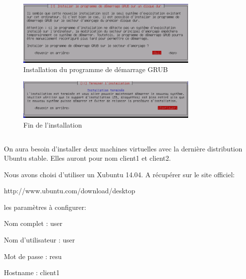 \documentclass[11pt,a4paper,titlepage, oneside]{article}
\begin{document}
		\begin{figure}[htp]
                        \centering
                        \includegraphics[width=0.8\textwidth,natwidth=610,natheight=642]{images/debian21.png}
                        \caption{Installation du programme de démarrage GRUB}
 		\end{figure}

		\begin{figure}[htp]
                        \centering
                        \includegraphics[width=0.8\textwidth,natwidth=610,natheight=642]{images/debian22.png}
                        \caption{Fin de l'installation}
		\end{figure}
		
\newpage
\subsection{{\color{blue}{Installation du client ubuntu}}}
	\paragraph{}
	        On aura besoin d'installer deux machines virtuelles avec la dernière distribution Ubuntu stable. Elles auront pour nom client1 et client2.

		Nous avons choisi d'utiliser un Xubuntu 14.04. A récupérer sur le site officiel:
		
		http://www.ubuntu.com/download/desktop
		
		les paramètres à configurer:
		
		Nom complet : user
			
		Nom d'utilisateur : user
		
		Mot de passe : resu
		
		Hostname : client1
		
\end{document}
